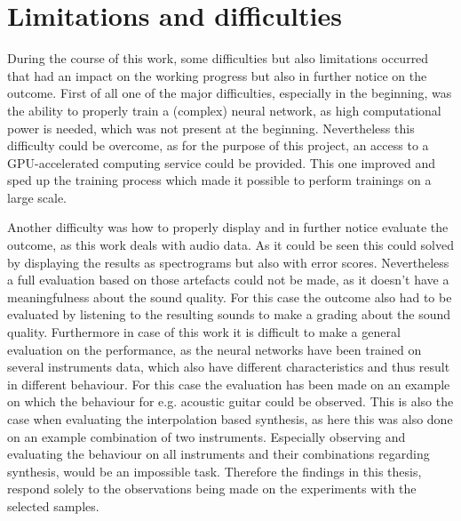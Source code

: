 \section{Limitations and difficulties}
During the course of this work, some difficulties but also limitations occurred that had an impact on the working progress but also in further notice on the outcome. First of all one of the major difficulties, especially in the beginning, was the ability to properly train a (complex) neural network, as high computational power is needed, which was not present at the beginning. Nevertheless this difficulty could be overcome, as for the purpose of this project, an access to a GPU-accelerated computing service could be provided. This one improved and sped up the training process which made it possible to perform trainings on a large scale.

Another difficulty was how to properly display and in further notice evaluate the outcome, as this work deals with audio data. As it could be seen this could solved by displaying the results as spectrograms but also with error scores. Nevertheless a full evaluation based on those artefacts could not be made, as it doesn't have a meaningfulness about the sound quality. For this case the outcome also had to be evaluated by listening to the resulting sounds to make a grading about the sound quality. Furthermore in case of this work it is difficult to make a general evaluation on the performance, as the neural networks have been trained on several instruments data, which also have different characteristics and thus result in different behaviour. For this case the evaluation has been made on an example on which the behaviour for e.g. acoustic guitar could be observed. This is also the case when evaluating the interpolation based synthesis, as here this was also done on an example combination of two instruments. Especially observing and evaluating the behaviour on all instruments and their combinations regarding synthesis, would be an impossible task. Therefore the findings in this thesis, respond solely to the observations being made on the experiments with the selected samples. 

